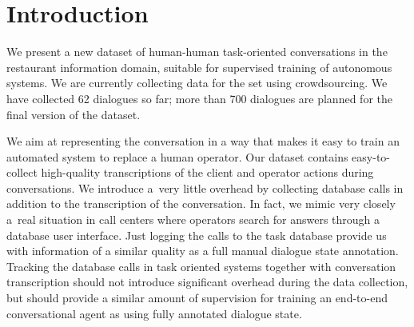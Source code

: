 \documentclass[runningheads,a4paper]{llncs}
\begin{document}
\section{Introduction}\label{sec:intro}
\vspace{-0.50em}
We present a new dataset of human-human task-oriented conversations in the restaurant information domain, suitable for supervised training of autonomous systems. 
We are currently collecting data for the set using crowdsourcing. We have collected 62 dialogues so far; more than 700 dialogues are planned for the final version of the dataset.

We aim at representing the conversation in a way that makes it easy to train an automated system to replace a human operator. 
Our dataset contains easy-to-collect high-quality transcriptions of the client and operator actions during conversations.
We introduce a~very little overhead by collecting database calls in addition to the transcription of the conversation.
In fact, we mimic very closely a~real situation in call centers where operators search for answers through a database user interface. 
Just logging the calls to the task database provide us with information of a similar quality as a full manual dialogue state annotation.
Tracking the database calls in task oriented systems together with conversation transcription should not introduce significant overhead during the data collection, but should provide a similar amount of supervision for training an end-to-end conversational agent as using fully annotated dialogue state.
\end{document}
